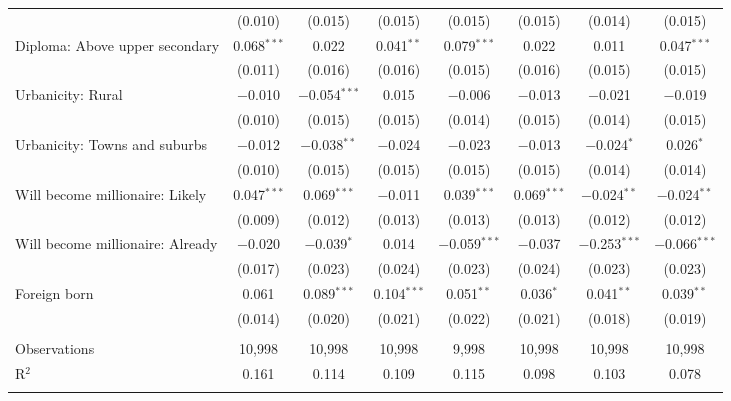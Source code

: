 \begin{tabular}{@{\extracolsep{5pt}}lccccccc}
  & (0.010) & (0.015) & (0.015) & (0.015) & (0.015) & (0.014) & (0.015) \\ 
  Diploma: Above upper secondary & 0.068$^{***}$ & 0.022 & 0.041$^{**}$ & 0.079$^{***}$ & 0.022 & 0.011 & 0.047$^{***}$ \\ 
  & (0.011) & (0.016) & (0.016) & (0.015) & (0.016) & (0.015) & (0.015) \\ 
  Urbanicity: Rural & $-$0.010 & $-$0.054$^{***}$ & 0.015 & $-$0.006 & $-$0.013 & $-$0.021 & $-$0.019 \\ 
  & (0.010) & (0.015) & (0.015) & (0.014) & (0.015) & (0.014) & (0.015) \\ 
  Urbanicity: Towns and suburbs & $-$0.012 & $-$0.038$^{**}$ & $-$0.024 & $-$0.023 & $-$0.013 & $-$0.024$^{*}$ & 0.026$^{*}$ \\ 
  & (0.010) & (0.015) & (0.015) & (0.015) & (0.015) & (0.014) & (0.014) \\ 
  Will become millionaire: Likely & 0.047$^{***}$ & 0.069$^{***}$ & $-$0.011 & 0.039$^{***}$ & 0.069$^{***}$ & $-$0.024$^{**}$ & $-$0.024$^{**}$ \\ 
  & (0.009) & (0.012) & (0.013) & (0.013) & (0.013) & (0.012) & (0.012) \\ 
  Will become millionaire: Already & $-$0.020 & $-$0.039$^{*}$ & 0.014 & $-$0.059$^{***}$ & $-$0.037 & $-$0.253$^{***}$ & $-$0.066$^{***}$ \\ 
  & (0.017) & (0.023) & (0.024) & (0.023) & (0.024) & (0.023) & (0.023) \\ 
  Foreign born & 0.061 & 0.089$^{***}$ & 0.104$^{***}$ & 0.051$^{**}$ & 0.036$^{*}$ & 0.041$^{**}$ & 0.039$^{**}$ \\ 
  & (0.014) & (0.020) & (0.021) & (0.022) & (0.021) & (0.018) & (0.019) \\ 
 \hline \\[-1.8ex] 

Observations & 10,998 & 10,998 & 10,998 & 9,998 & 10,998 & 10,998 & 10,998 \\ 
R$^{2}$ & 0.161 & 0.114 & 0.109 & 0.115 & 0.098 & 0.103 & 0.078 \\ 
\hline 
\hline \\[-1.8ex] 
\end{tabular} 